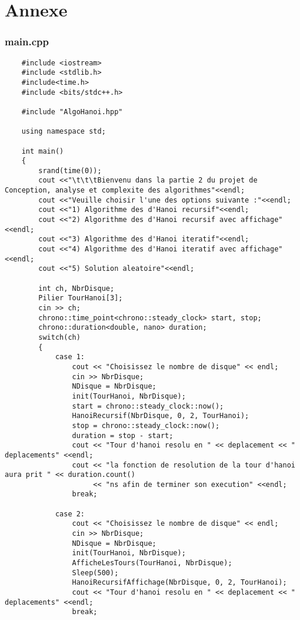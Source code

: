 \chapter{Annexe}

\subsection*{main.cpp}
\begin{verbatim}
    #include <iostream>
    #include <stdlib.h>
    #include<time.h>
    #include <bits/stdc++.h>
    
    #include "AlgoHanoi.hpp"
    
    using namespace std;
    
    int main()
    {
        srand(time(0));
        cout <<"\t\t\tBienvenu dans la partie 2 du projet de Conception, analyse et complexite des algorithmes"<<endl;
        cout <<"Veuille choisir l'une des options suivante :"<<endl;
        cout <<"1) Algorithme des d'Hanoi recursif"<<endl;
        cout <<"2) Algorithme des d'Hanoi recursif avec affichage"<<endl;
        cout <<"3) Algorithme des d'Hanoi iteratif"<<endl;
        cout <<"4) Algorithme des d'Hanoi iteratif avec affichage"<<endl;
        cout <<"5) Solution aleatoire"<<endl;
    
        int ch, NbrDisque;
        Pilier TourHanoi[3];
        cin >> ch;
        chrono::time_point<chrono::steady_clock> start, stop;
        chrono::duration<double, nano> duration;
        switch(ch)
        {
            case 1:
                cout << "Choisissez le nombre de disque" << endl;
                cin >> NbrDisque;
                NDisque = NbrDisque;
                init(TourHanoi, NbrDisque);
                start = chrono::steady_clock::now();
                HanoiRecursif(NbrDisque, 0, 2, TourHanoi);
                stop = chrono::steady_clock::now();
                duration = stop - start;
                cout << "Tour d'hanoi resolu en " << deplacement << " deplacements" <<endl;
                cout << "la fonction de resolution de la tour d'hanoi aura prit " << duration.count()
                     << "ns afin de terminer son execution" <<endl;
                break;
    
            case 2:
                cout << "Choisissez le nombre de disque" << endl;
                cin >> NbrDisque;
                NDisque = NbrDisque;
                init(TourHanoi, NbrDisque);
                AfficheLesTours(TourHanoi, NbrDisque);
                Sleep(500);
                HanoiRecursifAffichage(NbrDisque, 0, 2, TourHanoi);
                cout << "Tour d'hanoi resolu en " << deplacement << " deplacements" <<endl;
                break;
    

\end{verbatim}
